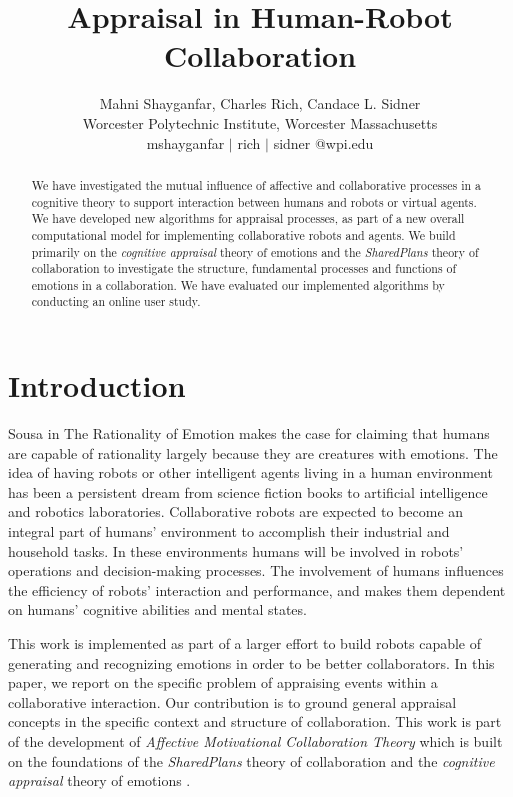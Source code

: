 \documentclass{article}
\title{Appraisal in Human-Robot Collaboration}
\author{Mahni Shayganfar, Charles Rich, Candace L. Sidner \\ 
Worcester Polytechnic Institute, Worcester Massachusetts  \\
mshayganfar $|$ rich $|$ sidner @wpi.edu}
\begin{document}
\maketitle

\begin{abstract}
We have investigated the mutual influence of affective and collaborative
processes in a cognitive theory to support interaction between humans and robots
or virtual agents. We have developed new algorithms for appraisal processes, as
part of a new overall computational model for implementing collaborative robots
and agents. We build primarily on the \textit{cognitive appraisal} theory of
emotions and the \textit{SharedPlans} theory of collaboration to investigate the
structure, fundamental processes and functions of emotions in a collaboration.
We have evaluated our implemented algorithms by conducting an online user study.
\end{abstract}

\section{Introduction}

Sousa in The Rationality of Emotion \cite{sousa:rationality-emotion}
makes the case for claiming that humans are capable of rationality largely
because they are creatures with emotions. The idea of having robots or other
intelligent agents living in a human environment has been a persistent dream
from science fiction books to artificial intelligence and robotics laboratories.
Collaborative robots are expected to become an integral part of humans'
environment to accomplish their industrial and household tasks. In these
environments humans will be involved in robots' operations and decision-making
processes. The involvement of humans influences the efficiency of robots'
interaction and performance, and makes them dependent on humans' cognitive
abilities and mental states.

This work is implemented as part of a larger effort to build robots capable of
generating and recognizing emotions in order to be better collaborators. In this
paper, we report on the specific problem of appraising events within a
collaborative interaction. Our contribution is to ground general appraisal
concepts in the specific context and structure of collaboration. This work is
part of the development of \textit{Affective Motivational Collaboration Theory}
which is built on the foundations of the \textit{SharedPlans} theory of
collaboration \cite{grosz:plans-discourse} and the \textit{cognitive appraisal}
theory of emotions \cite{gratch:domain-independent}.
\end{document}
